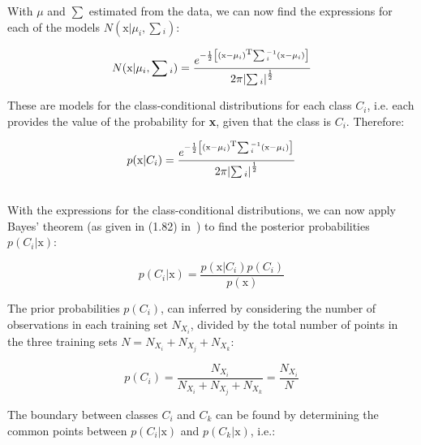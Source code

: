 \documentclass[paper=a4, fontsize=11pt]{scrartcl} %
\numberwithin{equation}{section} %
\numberwithin{figure}{section} %
\numberwithin{table}{section} %
\begin{document}
With $\mu$ and $\sum$ estimated from the data, we can now find 
the expressions for each of the models $N(\text{x}|\mu_i,\sum\text{$_{i}$})$:

\begin{equation}
        N(\text{x}|\mu_i,\sum\text{$_{i}$}) = \frac{e^{-\frac{1}{2}\left[\left(\text{x} - \mu_{i}\right)\textsuperscript{T}{\sum\text{$^{-1}_{i}$}}\left(\text{x} - \mu_{i}\right)\right]}}{2\pi{\left|\sum\text{$_{i}$}\right|}^{\frac{1}{2}}}
    \label{eq:normal-u12-1}
\end{equation}

These are models for the class-conditional distributions for each class 
$C_i$, i.e. each provides the value of the probability for \textbf{x}, given 
that the class is $C_i$. Therefore:

\begin{equation}
        p(\text{x}|C_i) = \frac{e^{-\frac{1}{2}\left[\left(\text{x} - \mu_{i}\right)\textsuperscript{T}{\sum\text{$^{-1}_{i}$}}\left(\text{x} - \mu_{i}\right)\right]}}{2\pi{\left|\sum\text{$_{i}$}\right|}^{\frac{1}{2}}}
    \label{eq:normal-u12-1}
\end{equation}

\subsection{}
\label{subsec:2-3}

With the expressions for the class-conditional distributions, we can now apply
Bayes' theorem (as given in (1.82) in~\cite{Bishop2006}) to find the posterior 
probabilities $p(C_i|\text{x})$:

\begin{equation}
    p(C_i|\text{x}) = \frac{p(\text{x}|C_i)p(C_i)}{p(\text{x})}
    \label{eq:posteriors}
\end{equation}

The prior probabilities $p(C_i)$, can inferred by 
considering the number of observations in each training set $N_{X_i}$, 
divided by the total number of points in the three training sets $N = N_{X_i} 
+ N_{X_j} + N_{X_k}$:

\begin{equation}
    p(C_i) = \frac{N_{X_i}}{N_{X_i} + N_{X_j} + N_{X_k}} = \frac{N_{X_i}}{N}
    \label{eq:priors}
\end{equation}

The boundary between classes $C_i$ and $C_k$ can be found by determining the 
common points between $p(C_i|\text{x})$ and 
$p(C_k|\text{x})$, i.e.:
\end{document}
